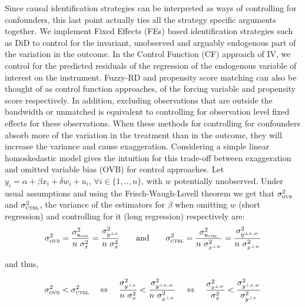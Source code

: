 			Since causal identification strategies can be interpreted as ways of controlling for confounders, this last point actually ties all the strategy specific arguments together. We implement Fixed Effects (FEs) based identification strategies such as DiD to control for the invariant, unobserved and arguably endogenous part of the variation in the outcome. In the Control Function (CF) approach of IV, we control for the predicted residuals of the regression of the endogenous variable of interest on the instrument. Fuzzy-RD and propensity score matching can also be thought of as control function approaches, of the forcing variable and propensity score respectively. In addition, excluding observations that are outside the bandwidth or unmatched is equivalent to controlling for observation level fixed effects for these observations. When these methods for controlling for confounders absorb more of the variation in the treatment than in the outcome, they will increase the variance and cause exaggeration. Considering a simple linear homoskedastic model gives the intuition for this trade-off between exaggeration and omitted variable bias (OVB) for control approaches.  Let $y_{i} = \alpha + \beta x_{i} + \delta w_{i} + u_{i}$, $\forall i \in \{1, .., n\}$,  with $w$ potentially unobserved. Under usual assumptions and using the Frisch-Waugh-Lovell theorem we get that $ \sigma_{\textsc{ovb}}^2$ and $ \sigma_{\textsc{ctrl}}^2$, the variance of the estimators for $\beta$ when omitting $w$ (short regression) and controlling for it (long regression) respectively are:
			~
			\[
				\sigma_{\textsc{ovb}}^2 =
				 \dfrac{\sigma^{2}_{u_{\textsc{ovb}}}}{n \ \sigma_{x}^{2}} =
				 \dfrac{\sigma^{2}_{y^{\perp x}}}{n \ \sigma_{x}^{2}}
				 \qquad \text{and} \qquad
				 \sigma_{\textsc{ctrl}}^2 = 
				 \dfrac{\sigma^{2}_{u_{\textsc{ctrl}}}}{n \ \sigma_{x^{\perp w}}^{2}} =
				  \dfrac{\sigma^{2}_{y^{\perp x, w}}}{n \ \sigma_{x^{\perp w}}^{2}}
			\]
			
			and thus,
			
			\[
				 \sigma_{\textsc{ovb}}^2 < \sigma_{\textsc{ctrl}}^2
				 	\quad \Leftrightarrow \quad 
					\dfrac{\sigma^{2}_{y^{\perp x}}}{n \ \sigma_{x}^{2}} <
				 	\dfrac{\sigma^{2}_{y^{\perp x, w}}}{n \ \sigma_{x^{\perp w}}^{2}} 
					\quad \Leftrightarrow \quad 
					\dfrac{\sigma^{2}_{x^{\perp w}}}{\sigma_{x}^{2}} <
					\dfrac{\sigma^{2}_{y^{\perp x, w}}}{ \sigma_{y^{\perp x}}^{2}}
			\]
			
